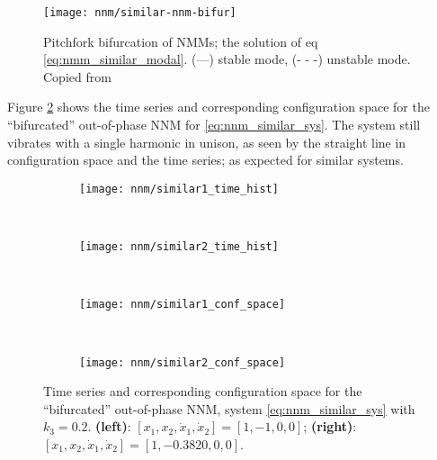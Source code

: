 \begin{figure}[!ht]
  \centering
  \texttt{[image: nnm/similar-nnm-bifur]}
  \caption{Pitchfork bifurcation of NMMs; the solution of eq
    \eqref{eq:nmm_similar_modal}. (---) stable mode, (- - -) unstable mode.
    Copied from \autocite{vakakis1992a}}
  \label{fig:nnm_similar_bifur}
\end{figure}


Figure \ref{fig:nnm_similar} shows the time series and corresponding
configuration space for the ``bifurcated'' out-of-phase NNM for
\eqref{eq:nnm_similar_sys}. The system still vibrates with a single harmonic in
unison, as seen by the straight line in configuration space and the time series;
as expected for similar systems.

\begin{figure}[!ht]
  \centering
  \begin{subfigure}[b]{0.45\textwidth}
    \texttt{[image: nnm/similar1\_time\_hist]}
  \end{subfigure}
  ~
  \begin{subfigure}[b]{0.45\textwidth}
    \texttt{[image: nnm/similar2\_time\_hist]}
  \end{subfigure} \\
  \begin{subfigure}[b]{0.45\textwidth}
    \texttt{[image: nnm/similar1\_conf\_space]}
  \end{subfigure}
  ~
  \begin{subfigure}[b]{0.45\textwidth}
    \texttt{[image: nnm/similar2\_conf\_space]}
  \end{subfigure}
  \caption{Time series and corresponding configuration space for the
    ``bifurcated'' out-of-phase NNM, system \eqref{eq:nnm_similar_sys} with
    $k_3=0.2$.
    \textbf{(left)}: $[x_1, x_2, \dot x_1, \dot x_2] = [1,-1,0,0]$;
    \textbf{(right)}: $[x_1, x_2, \dot x_1, \dot x_2] = [1, -0.3820,0,0]$.}
  \label{fig:nnm_similar}
\end{figure}








